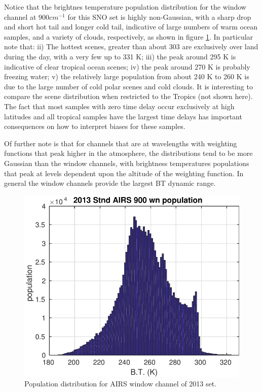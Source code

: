 \documentclass[11pt]{article}
\begin{document}
Notice that the brightnes temperature population distribution for the window channel at $900 cm^{-1}$ for this SNO set is highly non-Gaussian, with a sharp drop and short hot tail and longer cold tail, indicative of large numbers of warm ocean samples, and a variety of clouds, respectively, as shown in figure \ref{fig:Y2}. In particular note that: 
ii) The hottest scenes, greater than about 303 are exclusively over land during the day, with a very few up to 331 K; 
iii) the peak around 295 K is indicative of clear tropical ocean scenes; 
iv) the peak around 270 K is probably freezing water; 
v) the relatively large population from about 240 K to 260 K is due to the large number of cold polar scenes and cold clouds. It is interesting to compare the scene distribution when restricted to the Tropics (not shown here). The fact that most samples with zero time delay occur exclusively at high latitudes and all tropical samples have the largest time delays has important consequences on how to interpret biases for these samples.

Of further note is that for channels that are at wavelengths with weighting functions that peak higher in the atmosphere, the distributions tend to be more Gaussian than the window channels, with brightness temperatures populations that peak at levels dependent upon the altitude of the weighting function. In general the window channels provide the largest BT dynamic range.

\begin{figure}[htb]
\centering
\includegraphics[width=.6\linewidth]{./figs/2013_AC_stnd_Airs_900wn_hist.pdf}
\caption{\label{fig:orgparagraph11}
  Population distribution for AIRS window channel of 2013 set.}
\label{fig:Y2}
\end{figure}

\end{document}
